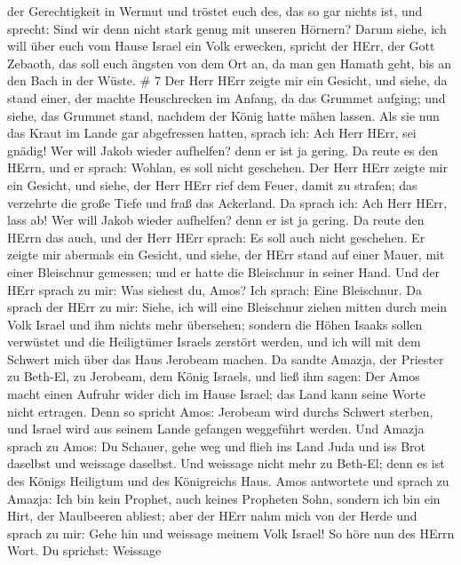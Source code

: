 der Gerechtigkeit in Wermut  und tröstet euch des, das so
gar nichts ist, und sprecht: Sind wir denn nicht stark genug mit unseren
Hörnern?  Darum siehe, ich will über euch vom Hause Israel
ein Volk erwecken, spricht der HErr, der Gott Zebaoth, das soll euch
ängsten von dem Ort an, da man gen Hamath geht, bis an den Bach in der
Wüste. \# 7  Der Herr HErr zeigte mir ein Gesicht, und
siehe, da stand einer, der machte Heuschrecken im Anfang, da das Grummet
aufging; und siehe, das Grummet stand, nachdem der König hatte mähen
lassen.  Als sie nun das Kraut im Lande gar abgefressen
hatten, sprach ich: Ach Herr HErr, sei gnädig! Wer will Jakob wieder
aufhelfen? denn er ist ja gering.  Da reute es den HErrn,
und er sprach: Wohlan, es soll nicht geschehen.  Der Herr
HErr zeigte mir ein Gesicht, und siehe, der Herr HErr rief dem Feuer,
damit zu strafen; das verzehrte die große Tiefe und fraß das Ackerland.
 Da sprach ich: Ach Herr HErr, lass ab! Wer will Jakob
wieder aufhelfen? denn er ist ja gering.  Da reute den HErrn
das auch, und der Herr HErr sprach: Es soll auch nicht geschehen.
 Er zeigte mir abermals ein Gesicht, und siehe, der HErr
stand auf einer Mauer, mit einer Bleischnur gemessen; und er hatte die
Bleischnur in seiner Hand.  Und der HErr sprach zu mir: Was
siehest du, Amos? Ich sprach: Eine Bleischnur. Da sprach der HErr zu
mir: Siehe, ich will eine Bleischnur ziehen mitten durch mein Volk
Israel und ihm nichts mehr übersehen;  sondern die Höhen
Isaaks sollen verwüstet und die Heiligtümer Israels zerstört werden, und
ich will mit dem Schwert mich über das Haus Jerobeam machen.
 Da sandte Amazja, der Priester zu Beth-El, zu Jerobeam,
dem König Israels, und ließ ihm sagen: Der Amos macht einen Aufruhr
wider dich im Hause Israel; das Land kann seine Worte nicht ertragen.
 Denn so spricht Amos: Jerobeam wird durchs Schwert
sterben, und Israel wird aus seinem Lande gefangen weggeführt werden.
 Und Amazja sprach zu Amos: Du Schauer, gehe weg und flieh
ins Land Juda und iss Brot daselbst und weissage daselbst. 
Und weissage nicht mehr zu Beth-El; denn es ist des Königs Heiligtum und
des Königreichs Haus.  Amos antwortete und sprach zu
Amazja: Ich bin kein Prophet, auch keines Propheten Sohn, sondern ich
bin ein Hirt, der Maulbeeren abliest;  aber der HErr nahm
mich von der Herde und sprach zu mir: Gehe hin und weissage meinem Volk
Israel!  So höre nun des HErrn Wort. Du sprichst: Weissage
